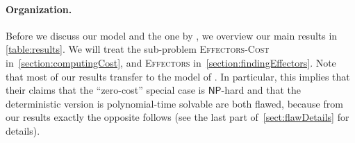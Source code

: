 \documentclass{article}
\newcommand{\np}{{\mathsf{NP}}}
\newcommand{\mytabref}[1]{\autoref{#1}}
\newcommand{\probEffectors}{\textsc{Effectors}\xspace}
\begin{document}
\paragraph{Organization.}
Before we discuss our model and the one by \citet{LTGMH10}, 
we overview our main results in \autoref{table:results}.
We will treat the sub-problem \textsc{Eff\-ectors-Cost}
in~\autoref{section:computingCost},
and \probEffectors in~\autoref{section:findingEffectors}.
Note that most of our results transfer to the model of \citet{LTGMH10}.
In particular, this implies that their claims that the ``zero-cost'' 
special case is $\np$-hard \cite[Lemma~1]{LTGMH10} and that the deterministic version is polynomial-time solvable
are both flawed, because from our results exactly the opposite follows
(see the last part of~\autoref{sect:flawDetails} for details).

  \newcommand{\with}[1]{ {\scriptsize $[$wrt.~$#1]$}}
  \newcommand{\see}[1]{ {\scriptsize \mytabref{#1}}}
  \newcommand{\seecite}[1]{ {\scriptsize \cite{#1}}}
  \newcommand{\clippedPath}[2][] {
    \begin{scope}
      \clip #2;
      \draw[#1] #2;
    \end{scope}
    \draw[white, line width=1pt] #2;
  }
  
  \newcommand{\resultBox}[2]{    
    \clippedPath[line width=4pt, #1!75!black, fill= #1!5]{#2}    
  }
  
  \newcommand{\titleBox}[1][1]{    
    \clippedPath[line width=3pt, black ]{(-1.4,0) -- (-1.4,#1) -- (0,#1) -- (0,0) --cycle }        
  } 
  \newcommand{\titleNode}[2][0.5]{    
    \node[rectangle,align=center] () at (-0.7,#1) {#2};    
  }  
  
\end{document}
